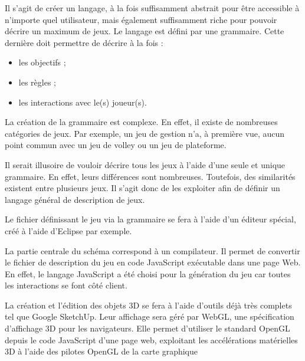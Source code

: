 \vspace{0.5cm}

Il s'agit de créer un langage, à la fois suffisamment abstrait pour être accessible à n'importe quel utilisateur, mais également suffisamment riche
pour pouvoir décrire un maximum de jeux.
Le langage est défini par une grammaire.
Cette dernière doit permettre de décrire à la fois :
\begin{itemize}
 \item les objectifs ;
 \item les règles ;
 \item les interactions avec le(s) joueur(s).
\end{itemize}

\vspace{1cm}

La création de la grammaire est complexe. En effet, il existe de nombreuses catégories de jeux.
Par exemple, un jeu de gestion n'a, à première vue, aucun point commun avec un jeu de volley ou un jeu de plateforme.

\vspace{0.5cm}

Il serait illusoire de vouloir décrire tous les jeux à l'aide d'une seule et unique grammaire.
En effet, leurs différences sont nombreuses.
Toutefois, des similarités existent entre plusieurs jeux. Il s'agit donc de les exploiter afin de définir un langage général de description de jeux.

\vspace{0.5cm}

Le fichier définissant le jeu via la grammaire se fera à l'aide d'un éditeur spécial, créé à l'aide d'Eclipse par exemple.

\vspace{0.5cm}

La partie centrale du schéma correspond à un compilateur.
Il permet de convertir le fichier de description du jeu en code JavaScript exécutable dans une page Web.
En effet, le langage JavaScript a été choisi pour la génération du jeu car toutes les interactions se font côté client.

\vspace{0.5cm}

La création et l'édition des objets 3D se fera à l'aide d'outils déjà très complets tel que Google SketchUp.
Leur affichage sera géré par WebGL, une spécification d'affichage 3D pour les navigateurs. 
Elle permet d'utiliser le standard OpenGL depuis le code JavaScript d'une page web, 
exploitant les accélérations matérielles 3D à l'aide des pilotes OpenGL de la carte graphique